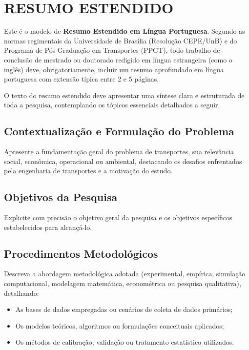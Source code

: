 \begin{otherlanguage}{brazilian}
\chapter*{RESUMO ESTENDIDO}
\label{resumoestendido}

Este é o modelo de \textbf{Resumo Estendido em Língua Portuguesa}. Segundo as normas regimentais da Universidade de Brasília (Resolução CEPE/UnB) e do Programa de Pós-Graduação em Transportes (PPGT), todo trabalho de conclusão de mestrado ou doutorado redigido em língua estrangeira (como o inglês) deve, obrigatoriamente, incluir um resumo aprofundado em língua portuguesa com extensão típica entre 2 e 5 páginas.

O texto do resumo estendido deve apresentar uma síntese clara e estruturada de toda a pesquisa, contemplando os tópicos essenciais detalhados a seguir.

\section*{Contextualização e Formulação do Problema}

Apresente a fundamentação geral do problema de transportes, sua relevância social, econômica, operacional ou ambiental, destacando os desafios enfrentados pela engenharia de transportes e a motivação do estudo.

\section*{Objetivos da Pesquisa}

Explicite com precisão o objetivo geral da pesquisa e os objetivos específicos estabelecidos para alcançá-lo.

\section*{Procedimentos Metodológicos}

Descreva a abordagem metodológica adotada (experimental, empírica, simulação computacional, modelagem matemática, econométrica ou pesquisa qualitativa), detalhando:
\begin{itemize}
    \item As bases de dados empregadas ou cenários de coleta de dados primários;
    \item Os modelos teóricos, algoritmos ou formulações conceituais aplicados;
    \item Os métodos de calibração, validação ou tratamento estatístico utilizados.
\end{itemize}


\end{otherlanguage}
